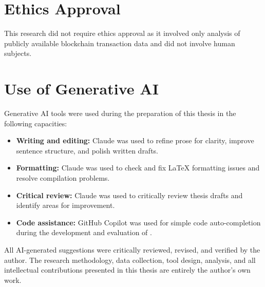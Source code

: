 \section*{Ethics Approval}

This research did not require ethics approval as it involved only analysis of publicly available blockchain transaction data and did not involve human subjects.

\section*{Use of Generative AI}

Generative AI tools were used during the preparation of this thesis in the following capacities:

\begin{itemize}
    \item \textbf{Writing and editing:} Claude was used to refine prose for clarity, improve sentence structure, and polish written drafts.

	\item \textbf{Formatting:} Claude was used to check and fix \LaTeX{} formatting issues and resolve compilation problems.

    \item \textbf{Critical review:} Claude was used to critically review thesis drafts and identify areas for improvement.

    \item \textbf{Code assistance:} GitHub Copilot was used for simple code auto-completion during the development and evaluation of \ToolName{}.
\end{itemize}

\noindent All AI-generated suggestions were critically reviewed, revised, and verified by the author. The research methodology, data collection, tool design, analysis, and all intellectual contributions presented in this thesis are entirely the author's own work.